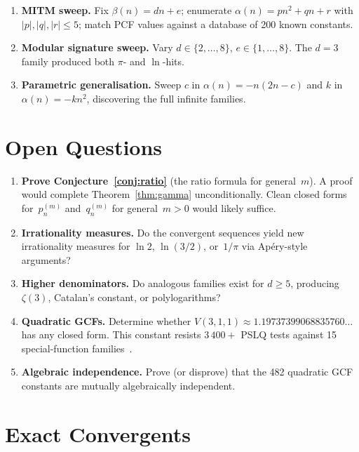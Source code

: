 \documentclass[11pt,a4paper]{article}
\theoremstyle{plain}
\theoremstyle{definition}
\theoremstyle{remark}
\begin{document}
\begin{enumerate}
\item \textbf{MITM sweep.}
  Fix $\beta(n) = dn{+}e$; enumerate
  $\alpha(n) = pn^2{+}qn{+}r$ with $|p|,|q|,|r| \le 5$;
  match PCF values against a database of 200 known constants.
\item \textbf{Modular signature sweep.}
  Vary $d \in \{2,\ldots,8\}$, $e \in \{1,\ldots,8\}$.
  The $d{=}3$ family produced both $\pi$- and $\ln$-hits.
\item \textbf{Parametric generalisation.}
  Sweep $c$ in $\alpha(n) = -n(2n{-}c)$ and $k$ in
  $\alpha(n) = -kn^2$, discovering the full infinite families.
\end{enumerate}

\section{Open Questions}\label{sec:open}

\begin{enumerate}
\item \textbf{Prove Conjecture~\ref{conj:ratio}}
  (the ratio formula for general~$m$).
  A proof would complete Theorem~\ref{thm:gamma} unconditionally.
  Clean closed forms for~$p_n^{(m)}$ and~$q_n^{(m)}$ for
  general~$m > 0$ would likely suffice.
\item \textbf{Irrationality measures.}
  Do the convergent sequences yield new irrationality measures
  for $\ln 2$, $\ln(3/2)$, or~$1/\pi$ via Ap\'ery-style arguments?
\item \textbf{Higher denominators.}
  Do analogous families exist for $d \ge 5$, producing $\zeta(3)$,
  Catalan's constant, or polylogarithms?
\item \textbf{Quadratic GCFs.}
  Determine whether
  $V(3,1,1) \approx 1.19737399068835760\ldots$
  has any closed form.
  This constant resists $3\,400{+}$ PSLQ tests against
  15 special-function families~\cite{raayoni2021}.
\item \textbf{Algebraic independence.}
  Prove (or disprove) that the 482 quadratic GCF constants are
  mutually algebraically independent.
\end{enumerate}

\appendix
\section{Exact Convergents}\label{app:conv}
\end{document}
